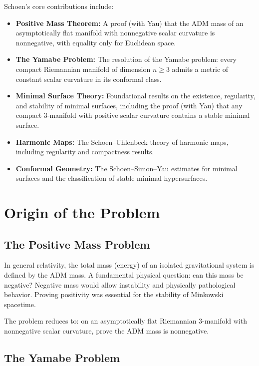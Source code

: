 Schoen's core contributions include:
\begin{itemize}
    \item \textbf{Positive Mass Theorem:} A proof (with Yau) that the ADM mass of an asymptotically flat manifold with nonnegative scalar curvature is nonnegative, with equality only for Euclidean space.
    \item \textbf{The Yamabe Problem:} The resolution of the Yamabe problem: every compact Riemannian manifold of dimension $n \geq 3$ admits a metric of constant scalar curvature in its conformal class.
    \item \textbf{Minimal Surface Theory:} Foundational results on the existence, regularity, and stability of minimal surfaces, including the proof (with Yau) that any compact 3-manifold with positive scalar curvature contains a stable minimal surface.
    \item \textbf{Harmonic Maps:} The Schoen--Uhlenbeck theory of harmonic maps, including regularity and compactness results.
    \item \textbf{Conformal Geometry:} The Schoen--Simon--Yau estimates for minimal surfaces and the classification of stable minimal hypersurfaces.
\end{itemize}

\section{Origin of the Problem}

\subsection{The Positive Mass Problem}

In general relativity, the total mass (energy) of an isolated gravitational system is defined by the ADM mass. A fundamental physical question: can this mass be negative? Negative mass would allow instability and physically pathological behavior. Proving positivity was essential for the stability of Minkowski spacetime.

The problem reduces to: on an asymptotically flat Riemannian 3-manifold with nonnegative scalar curvature, prove the ADM mass is nonnegative.

\subsection{The Yamabe Problem}

